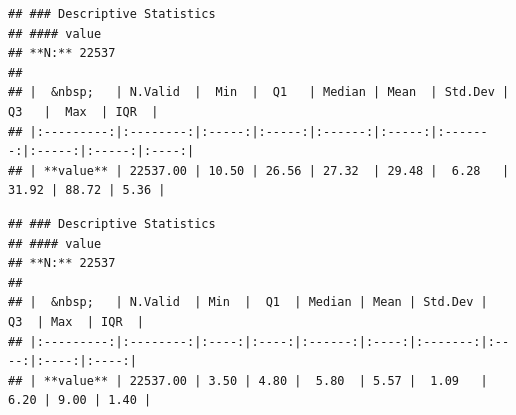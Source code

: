 \documentclass[
]{article}
\newenvironment{Shaded}{\begin{snugshade}}{\end{snugshade}}
\newcommand{\AttributeTok}[1]{\textcolor[rgb]{0.13,0.29,0.53}{#1}}
\newcommand{\ConstantTok}[1]{\textcolor[rgb]{0.56,0.35,0.01}{#1}}
\newcommand{\FunctionTok}[1]{\textcolor[rgb]{0.13,0.29,0.53}{\textbf{#1}}}
\newcommand{\NormalTok}[1]{#1}
\newcommand{\SpecialCharTok}[1]{\textcolor[rgb]{0.81,0.36,0.00}{\textbf{#1}}}
\newcommand{\StringTok}[1]{\textcolor[rgb]{0.31,0.60,0.02}{#1}}
\begin{document}
\begin{Shaded}
\end{Shaded}

\begin{verbatim}
## ### Descriptive Statistics  
## #### value  
## **N:** 22537  
## 
## |  &nbsp;   | N.Valid  |  Min  |  Q1   | Median | Mean  | Std.Dev |  Q3   |  Max  | IQR  |
## |:---------:|:--------:|:-----:|:-----:|:------:|:-----:|:-------:|:-----:|:-----:|:----:|
## | **value** | 22537.00 | 10.50 | 26.56 | 27.32  | 29.48 |  6.28   | 31.92 | 88.72 | 5.36 |
\end{verbatim}

\begin{Shaded}
\end{Shaded}

\begin{verbatim}
## ### Descriptive Statistics  
## #### value  
## **N:** 22537  
## 
## |  &nbsp;   | N.Valid  | Min  |  Q1  | Median | Mean | Std.Dev |  Q3  | Max  | IQR  |
## |:---------:|:--------:|:----:|:----:|:------:|:----:|:-------:|:----:|:----:|:----:|
## | **value** | 22537.00 | 3.50 | 4.80 |  5.80  | 5.57 |  1.09   | 6.20 | 9.00 | 1.40 |
\end{verbatim}
\end{document}
